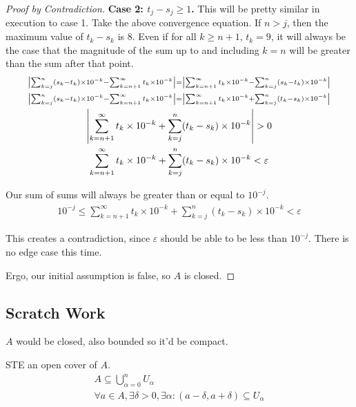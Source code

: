 \documentclass[12pt]{report}
\newenvironment{case}[2]{\par\textbf{Case #1: #2.}}{}
\begin{document}
\begin{proof}[Proof by Contradiction]
        \begin{case}{2}{$t_j - s_j \geq 1$}
            This will be pretty similar in execution to case 1.
            Take the above convergence equation.
            If $n > j$, then the maximum value of $t_k - s_k$ is $8$.
            Even if for all $k \geq n+1$, $t_k = 9$, it will always be the case that the magnitude of the sum up to and including $k = n$ will be greater than the sum after that point.
            \begin{gather}
                \scriptstyle
                \left| \sum_{k=j}^{n} (s_k - t_k) \times 10^{-k} - \sum_{k=n+1}^{\infty} t_k \times 10^{-k} \right| = \left| \sum_{k=n+1}^{\infty} t_k \times 10^{-k} - \sum_{k=j}^{n} (s_k - t_k) \times 10^{-k} \right|\\
                \scriptstyle
                \left| \sum_{k=j}^{n} (s_k - t_k) \times 10^{-k} - \sum_{k=n+1}^{\infty} t_k \times 10^{-k} \right| = \left| \sum_{k=n+1}^{\infty} t_k \times 10^{-k} + \sum_{k=j}^{n} (t_k - s_k) \times 10^{-k} \right|\\
                \left| \sum_{k=n+1}^{\infty} t_k \times 10^{-k} + \sum_{k=j}^{n} (t_k - s_k) \times 10^{-k} \right| > 0\\
                \sum_{k=n+1}^{\infty} t_k \times 10^{-k} + \sum_{k=j}^{n} (t_k - s_k) \times 10^{-k} < \varepsilon
            \end{gather}

            Our sum of sums will always be greater than or equal to $10^{-j}$.
            \begin{gather}
                10^{-j} \leq \sum_{k=n+1}^{\infty} t_k \times 10^{-k} + \sum_{k=j}^{n} (t_k - s_k) \times 10^{-k} < \varepsilon
            \end{gather}

            This creates a contradiction, since $\varepsilon$ should be able to be less than $10^{-j}$.
            There is no edge case this time.
        \end{case}

        Ergo, our initial assumption is false, so $A$ is closed.
    \end{proof}

    \subsection*{Scratch Work}
        $A$ would be closed, also bounded so it'd be compact.
        
        STE an open cover of $A$.
        \begin{gather}
            A \subseteq \bigcup_{\alpha = 0}^{n} U_\alpha\\
            \forall a \in A, \exists \delta > 0, \exists \alpha : (a - \delta, a + \delta) \subseteq U_\alpha
        \end{gather}
\end{document}
